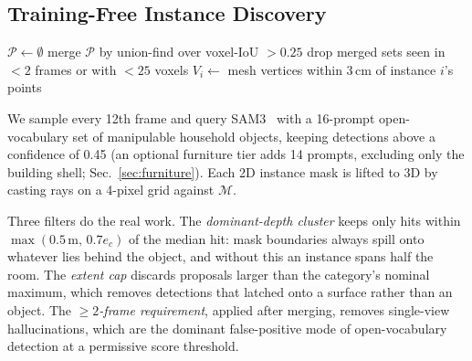 \subsection{Training-Free Instance Discovery}
\label{sec:discovery}

\ifextended
\begin{algorithm}[t]
\footnotesize
\SetAlgoLined
\DontPrintSemicolon
{}
$\mathcal{P} \leftarrow \emptyset$\;
merge $\mathcal{P}$ by union-find over voxel-IoU $>0.25$\;
drop merged sets seen in $<2$ frames or with $<25$ voxels\;
$V_i \leftarrow$ mesh vertices within 3\,cm of instance $i$'s points\;
\caption{Training-free instance discovery}
\label{alg:discovery}
\end{algorithm}
\fi


We sample every 12th
frame and query SAM3~\cite{sam3} with a 16-prompt open-vocabulary set of
manipulable household objects, keeping detections above a confidence of
0.45 (an optional furniture tier adds 14 prompts, excluding only the
building shell; Sec.~\ref{sec:furniture}). Each 2D instance mask is lifted
to 3D by casting rays on a 4-pixel grid against $\mathcal{M}$.

Three filters do the real work. The \emph{dominant-depth cluster} keeps
only hits within $\max(0.5\,\text{m},\,0.7 e_c)$ of the median hit: mask
boundaries always spill onto whatever lies behind the object, and without
this an instance spans half the room. The \emph{extent cap} discards
proposals larger than the category's nominal maximum, which removes
detections that latched onto a surface rather than an object. The
\emph{$\geq2$-frame requirement}, applied after merging, removes
single-view hallucinations, which are the dominant false-positive mode of
open-vocabulary detection at a permissive score threshold.

